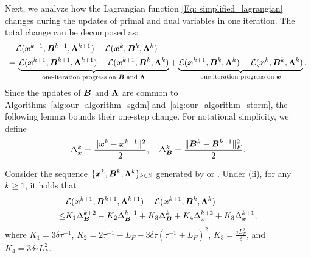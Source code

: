 Next, we analyze how the Lagrangian function \eqref{Eq: simplified_lagrangian} changes
during the updates of primal and dual variables in one iteration. The total change can be decomposed as:
\begin{align}
    \label{Eq: One-iteration progress decomposition} & \mathcal{L}(\bm{x}^{k+1}, \bm{B}^{k+1}, \bm{\Lambda}^{k+1}) - \mathcal{L}(\bm{x}^{k}, \bm{B}^{k}, \bm{\Lambda}^{k}) \notag                                                                                                                                                                                             \\
    =                                                & \,\underbrace{\mathcal{L}(\bm{x}^{k+1}, \bm{B}^{k+1}, \bm{\Lambda}^{k+1}) - \mathcal{L}(\bm{x}^{k+1}, \bm{B}^k, \bm{\Lambda}^k)}_{\text{one-iteration progress on $\bm{B}$ and $\bm{\Lambda}$}}+ \underbrace{\mathcal{L}(\bm{x}^{k+1}, \bm{B}^{k}, \bm{\Lambda}^{k}) - \mathcal{L}(\bm{x}^{k}, \bm{B}^k, \bm{\Lambda}^k)}_{\text{one-iteration progress on $\bm{x}$}}.
\end{align}
Since the updates of $\bm{B}$ and $\bm{\Lambda}$ are common to Algorithms~\ref{alg:our_algorithm_sgdm} and~\ref{alg:our_algorithm_storm}, the following lemma bounds their one-step change. 
For notational simplicity, we define
\[
    \Delta_{\bm{x}}^{k}= \frac{\|\bm{x}^{k}- \bm{x}^{k-1}\|^{2}}{2},\quad \Delta_{\bm{B}}^{k}
    = \frac{\|\bm{B}^{k}- \bm{B}^{k-1}\|^{2}_{F}}{2}.
\] 
\begin{lemma}
    \label{Lemma: One-iteration progress of B and Lambda}
    Consider the sequence $\{
    \bm{x}^{k}, \bm{B}^{k}, \bm{\Lambda}^{k}\}_{k \in \mathbb{N}}$ generated by 
    or . Under (ii), for any $k \geq 1$, it holds that
    \begin{align}
\label{item: B and Lambda}
&\mathcal{L}(\bm{x}^{k+1}, \bm{B}^{k+1}, \bm{\Lambda}^{k+1}) - \mathcal{L}(\bm{x}^{k+1}, \bm{B}^{k}, \bm{\Lambda}^{k}) \notag \\
\le& K_1 \Delta_{\bm{B}}^{k+2} - K_2 \Delta_{\bm{B}}^{k+1} + K_3 \Delta_{\bm{B}}^{k} 
+ K_4 \Delta_{\bm{x}}^{k+2} + K_3 \Delta_{\bm{x}}^{k+1}, 
\end{align} where \(K_1 = 3\delta\tau^{-1}\), \(K_2 = 2\tau^{-1} - L_F - 3\delta\tau(\tau^{-1} + L_F)^2\), \(K_3 = \frac{\tau L_{F}^{2}}{\delta}\), and \(K_4 = 3\delta\tau L_F^2\).
\end{lemma}
